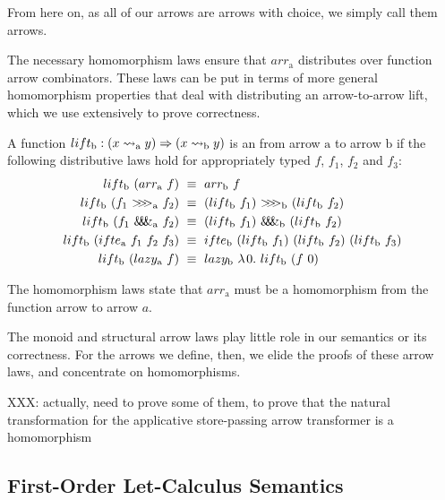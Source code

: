 \documentclass[preprint]{sigplanconf}
\newcommand{\arrow}{\rightsquigarrow}
\newcommand{\arrowlift}{\ensuremath{lift}}
\newcommand{\arrowarr}{\ensuremath{arr}}
\newcommand{\arrowcomp}{\ensuremath{{>}\mspace{-6mu}{>}\mspace{-6mu}{>}}}
\newcommand{\arrowpair}{\ensuremath{\mathit{\&\mspace{-7.5mu}\&\mspace{-7.5mu}\&}}}
\newcommand{\arrowif}{\ensuremath{ifte}}
\newcommand{\arrowlazy}{\ensuremath{lazy}}
\newcommand{\gen}{_\mathrm{a}}
\newcommand{\genb}{_\mathrm{b}}
\begin{document}
From here on, as all of our arrows are arrows with choice, we simply call them arrows.

The necessary homomorphism laws ensure that $\arrowarr\gen$ distributes over function arrow combinators.
These laws can be put in terms of more general homomorphism properties that deal with distributing an arrow-to-arrow lift, which we use extensively to prove correctness.

\begin{definition}
A function $lift\genb : (x \arrow\gen y) \tto (x \arrow\genb y)$ is an  from arrow $\mathrm{a}$ to arrow $\mathrm{b}$ if the following distributive laws hold for appropriately typed $f$, $f_1$, $f_2$ and $f_3$:
\begin{align}
	lift\genb~(\arrowarr\gen~f) &\ \equiv \ \arrowarr\genb~f
	\label{eqn:lift-distributes-over-arr}
\\
	lift\genb~(f_1~\arrowcomp\gen~f_2) &\ \equiv \ (lift\genb~f_1)~\arrowcomp\genb~(lift\genb~f_2)
	\label{eqn:lift-distributes-over-comp}
\\
	lift\genb~(f_1~\arrowpair\gen~f_2) &\ \equiv \ (lift\genb~f_1)~\arrowpair\genb~(lift\genb~f_2)
	\label{eqn:lift-distributes-over-pair}
\\
	\arrowlift\genb~(\arrowif\gen~f_1~f_2~f_3) &\ \equiv \ 
		\arrowif\genb~(lift\genb~f_1)~(lift\genb~f_2)~(lift\genb~f_3)
	\label{eqn:lift-distributes-over-if}
\\
	\arrowlift\genb~(\arrowlazy\gen~f) &\ \equiv \
		\arrowlazy\genb~\fun{0}{\arrowlift\genb~(f~0)}
	\label{eqn:lift-distributes-over-lazy}
\end{align}
\label{def:arrow-homomorphism}
\end{definition}

The homomorphism laws state that $\arrowarr\gen$ must be a homomorphism from the function arrow to arrow $a$.

The monoid and structural arrow laws play little role in our semantics or its correctness.
For the arrows we define, then, we elide the proofs of these arrow laws, and concentrate on homomorphisms.

XXX: actually, need to prove some of them, to prove that the natural transformation for the applicative store-passing arrow transformer is a homomorphism

\subsection{First-Order Let-Calculus Semantics}
\end{document}
